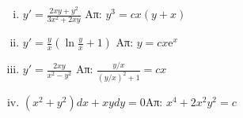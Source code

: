 \documentclass[a4paper,table]{report}
\begin{document}
\begin{enumerate}
    \begin{enumerate}[i)]
      \item $ y' = \frac{2xy+y^{2}}{3x^{2}+2xy} $ %
        \hfill Απ: $ y^{3}=cx(y+x) $ 
      \item $ y' = \frac{y}{x} (\ln{\frac{y}{x}} +1) $ %
        \hfill Απ: $ y=cx \mathrm{e}^{x} $ 
      \item $ y' = \frac{2xy}{x^{2}-y^{2}} $ %
        \hfill Απ: $ \frac{y/x}{(y/x)^{2}+1} = cx $ 
      \item $(x^2+y^2)dx+xydy=0$\hfill Απ: $x^4+2x^2y^2=c$
    \end{enumerate}
\end{enumerate}
\end{document}
